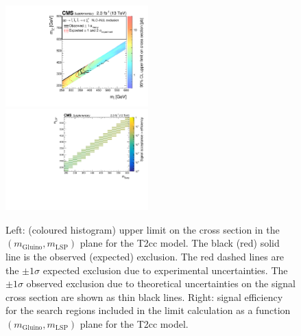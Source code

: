 \clearpage
\begin{figure}[t]
  \begin{center}
    \includegraphics[width=0.49\textwidth]{RA1T2ccXSEC_aux} \, 
    \includegraphics[width=0.49\textwidth]{T2cc_merging_4_cats_aux} \,     
  \end{center}
  \caption{Left: (coloured histogram) upper limit on the cross section in the $(m_{\mathrm{Gluino}},m_{\mathrm{LSP}})$ plane for the T2cc model. 
  The black (red) solid line is the observed (expected) exclusion. The red dashed lines are the $\pm1\sigma$ expected exclusion due to experimental uncertainties. 
  The $\pm1\sigma$ observed exclusion due to theoretical uncertainties on the signal cross section are shown as thin black lines. 
  Right: signal efficiency for the search regions included in the limit calculation as a function $(m_{\mathrm{Gluino}},m_{\mathrm{LSP}})$ plane for the T2cc model. 
  \label{fig:T2cc_excl}}
\end{figure}

